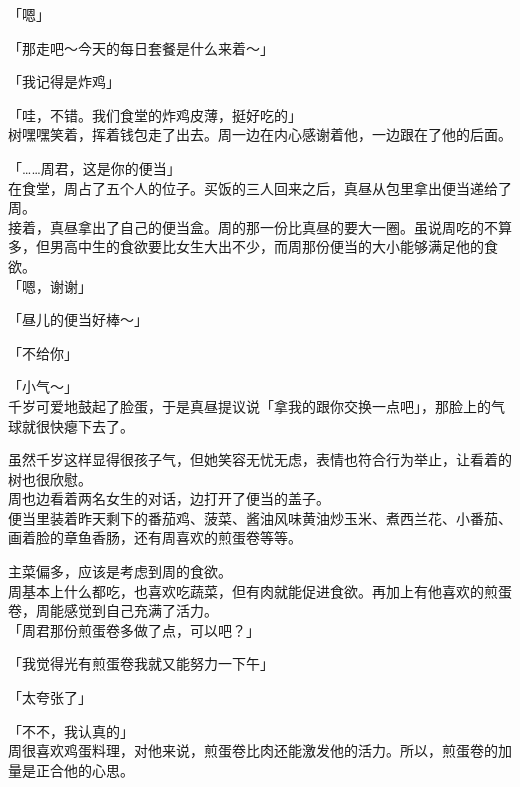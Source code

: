 「嗯」

「那走吧～今天的每日套餐是什么来着～」

「我记得是炸鸡」

「哇，不错。我们食堂的炸鸡皮薄，挺好吃的」\\

树嘿嘿笑着，挥着钱包走了出去。周一边在内心感谢着他，一边跟在了他的后面。\\

\vspace{2\baselineskip}

「……周君，这是你的便当」\\

在食堂，周占了五个人的位子。买饭的三人回来之后，真昼从包里拿出便当递给了周。\\

接着，真昼拿出了自己的便当盒。周的那一份比真昼的要大一圈。虽说周吃的不算多，但男高中生的食欲要比女生大出不少，而周那份便当的大小能够满足他的食欲。\\

「嗯，谢谢」

「昼儿的便当好棒～」

「不给你」

「小气～」\\

千岁可爱地鼓起了脸蛋，于是真昼提议说「拿我的跟你交换一点吧」，那脸上的气球就很快瘪下去了。

虽然千岁这样显得很孩子气，但她笑容无忧无虑，表情也符合行为举止，让看着的树也很欣慰。\\

周也边看着两名女生的对话，边打开了便当的盖子。\\

便当里装着昨天剩下的番茄鸡、菠菜、酱油风味黄油炒玉米、煮西兰花、小番茄、画着脸的章鱼香肠，还有周喜欢的煎蛋卷等等。

主菜偏多，应该是考虑到周的食欲。\\

周基本上什么都吃，也喜欢吃蔬菜，但有肉就能促进食欲。再加上有他喜欢的煎蛋卷，周能感觉到自己充满了活力。\\

「周君那份煎蛋卷多做了点，可以吧？」

「我觉得光有煎蛋卷我就又能努力一下午」

「太夸张了」

「不不，我认真的」\\

周很喜欢鸡蛋料理，对他来说，煎蛋卷比肉还能激发他的活力。所以，煎蛋卷的加量是正合他的心思。\\

